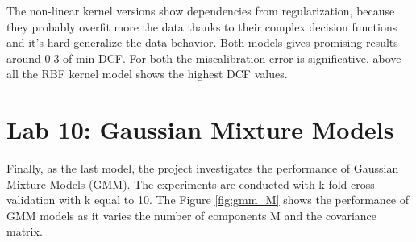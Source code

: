 \documentclass{article}
\begin{document}
The non-linear kernel versions show dependencies from regularization, because they probably overfit more the data thanks to their complex decision functions and it's hard generalize the data behavior. Both models gives promising results around 0.3 of min DCF. For both the miscalibration error is significative, above all the RBF kernel model shows the highest DCF values.

\section{Lab 10: Gaussian Mixture Models}
\label{sec:gmm}
Finally, as the last model, the project investigates the performance of Gaussian Mixture Models (GMM). The experiments are conducted with k-fold cross-validation with k equal to 10. The Figure \ref{fig:gmm_M} shows the performance of GMM models as it varies the number of components M and the covariance matrix.
\end{document}
